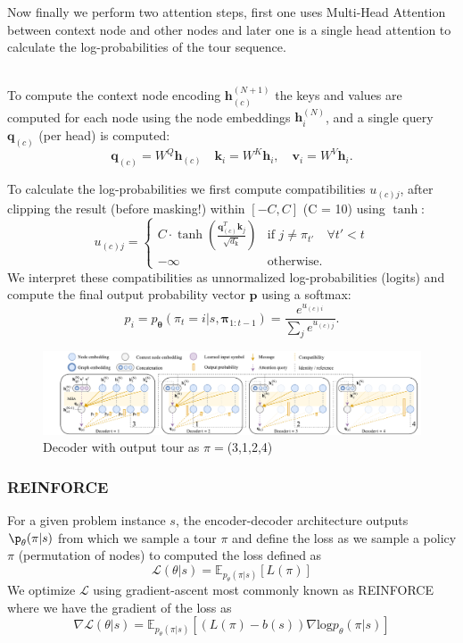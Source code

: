\documentclass{article}
\theoremstyle{definition}
\begin{document}
Now finally we perform two attention steps, first one uses Multi-Head Attention between context node and other nodes and later one is a single head attention to calculate the log-probabilities of the tour sequence.\\\

To compute the context node encoding $\mathbf{h}_{(c)}^{(N+1)}$ the keys and values are computed for each node using the node embeddings $\mathbf{h}_i^{(N)}$, and a single query $\mathbf{q}_{(c)}$ (per head) is computed:
\begin{equation}
\label{eq:dec_qkv}
	\mathbf{q}_{(c)} = W^Q \mathbf{h}_{(c)} \quad \mathbf{k}_i = W^K \mathbf{h}_i, \quad \mathbf{v}_i = W^V \mathbf{h}_i.
\end{equation}

To calculate the log-probabilities we first compute compatibilities $u_{(c)j}$, after clipping the result (before masking!) within $[-C, C]$ (C = 10) using $\tanh$:
\begin{equation}
\label{eq:dec_logits}
	u_{(c)j} = \begin{cases}
		C \cdot \tanh \left(\frac{\mathbf{q}_{(c)}^T \mathbf{k}_j}{\sqrt{d_{\text{k}}}}\right) & \text{if } j \neq \pi_{t'} \quad \forall t' < t \\
        -\infty & \text{otherwise.}
    \end{cases}
\end{equation}
We interpret these compatibilities as unnormalized log-probabilities (logits) and compute the final output probability vector $\mathbf{p}$ using a softmax:
\begin{equation}
	\label{dec:probabilities}
    p_i = p_{\bm{\theta}}(\pi_t = i|s, \bm{\pi}_{1:t-1}) = \frac{e^{u_{(c)i}}}{\sum_{j}{e^{u_{(c)j}}}}.
\end{equation}

\begin{figure}[H]
    \centering
    \includegraphics[width=15cm]{images/Decoder.pdf}
    \caption{Decoder with output tour as $\pi=$(3,1,2,4)}
    \label{fig:my_label}
\end{figure}

\subsubsection{REINFORCE}
For a given problem instance $s$, the encoder-decoder architecture outputs $\p_\theta(\pi|s)$ from which we sample a tour $\pi$ and define the loss as 
we sample a policy $\pi$ (permutation of nodes) to computed the loss defined as\\
\[\mathcal{L}(\theta|s)=\mathbb{E}_{p_\theta(\pi|s)}[L(\pi)]\]
We optimize $\mathcal{L}$ using gradient-ascent most commonly known as  REINFORCE where we have the gradient of the loss as
\[\nabla\mathcal{L}(\theta|s)=\mathbb{E}_{p_\theta(\pi|s)}[(L(\pi)-b(s))\nabla \text{log}p_\theta(\pi|s)]\]
\end{document}
